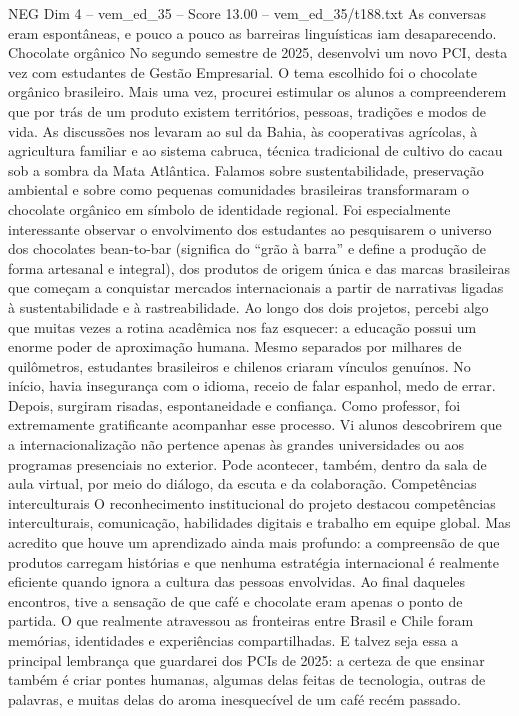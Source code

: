 \begin{textsample}{NEG Dim 4 – vem\_ed\_35 – Score 13.00 – vem\_ed\_35/t188.txt}
As conversas eram espontâneas, e pouco a pouco as barreiras linguísticas iam desaparecendo.
Chocolate orgânico No segundo semestre de 2025, desenvolvi um novo PCI, desta vez com estudantes de Gestão Empresarial.
O tema escolhido foi o chocolate orgânico brasileiro.
Mais uma vez, procurei estimular os alunos a compreenderem que por trás de um produto existem territórios, pessoas, tradições e modos de vida.
As discussões nos levaram ao sul da Bahia, às cooperativas agrícolas, à agricultura familiar e ao sistema cabruca, técnica tradicional de cultivo do cacau sob a sombra da Mata Atlântica.
Falamos sobre sustentabilidade, preservação ambiental e sobre como pequenas comunidades brasileiras transformaram o chocolate orgânico em símbolo de identidade regional.
Foi especialmente interessante observar o envolvimento dos estudantes ao pesquisarem o universo dos chocolates bean-to-bar (significa do “grão à barra” e define a produção de forma artesanal e integral), dos produtos de origem única e das marcas brasileiras que começam a conquistar mercados internacionais a partir de narrativas ligadas à sustentabilidade e à rastreabilidade.
Ao longo dos dois projetos, percebi algo que muitas vezes a rotina acadêmica nos faz esquecer: a educação possui um enorme poder de aproximação humana.
Mesmo separados por milhares de quilômetros, estudantes brasileiros e chilenos criaram vínculos genuínos.
No início, havia insegurança com o idioma, receio de falar espanhol, medo de errar.
Depois, surgiram risadas, espontaneidade e confiança.
Como professor, foi extremamente gratificante acompanhar esse processo.
Vi alunos descobrirem que a internacionalização não pertence apenas às grandes universidades ou aos programas presenciais no exterior.
Pode acontecer, também, dentro da sala de aula virtual, por meio do diálogo, da escuta e da colaboração.
Competências interculturais O reconhecimento institucional do projeto destacou competências interculturais, comunicação, habilidades digitais e trabalho em equipe global.
Mas acredito que houve um aprendizado ainda mais profundo: a compreensão de que produtos carregam histórias e que nenhuma estratégia internacional é realmente eficiente quando ignora a cultura das pessoas envolvidas.
Ao final daqueles encontros, tive a sensação de que café e chocolate eram apenas o ponto de partida.
O que realmente atravessou as fronteiras entre Brasil e Chile foram memórias, identidades e experiências compartilhadas.
E talvez seja essa a principal lembrança que guardarei dos PCIs de 2025: a certeza de que ensinar também é criar pontes humanas, algumas delas feitas de tecnologia, outras de palavras, e muitas delas do aroma inesquecível de um café recém passado.

\end{textsample}
